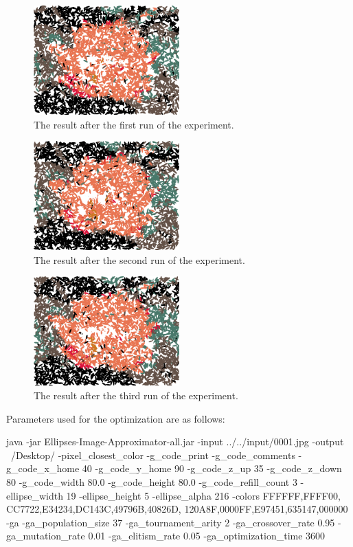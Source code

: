 \documentclass[conference]{IEEEtran}
\begin{document}
\begin{figure}[htbp]
\centerline{\includegraphics[width=0.5\textwidth]{fig02.png}}
\caption{The result after the first run of the experiment.}
\label{fig02}
\end{figure}

\begin{figure}[htbp]
\centerline{\includegraphics[width=0.5\textwidth]{fig03.png}}
\caption{The result after the second run of the experiment.}
\label{fig03}
\end{figure}

\begin{figure}[htbp]
\centerline{\includegraphics[width=0.5\textwidth]{fig04.png}}
\caption{The result after the third run of the experiment.}
\label{fig04}
\end{figure}

Parameters used for the optimization are as follows:

\begin{verbnobox}[\small]
java -jar Ellipses-Image-Approximator-all.jar 
-input ../../input/0001.jpg -output ~/Desktop/ 
-pixel_closest_color -g_code_print 
-g_code_comments -g_code_x_home 40 
-g_code_y_home 90 -g_code_z_up 35 
-g_code_z_down 80 -g_code_width 80.0 
-g_code_height 80.0 -g_code_refill_count 3 
-ellipse_width 19 -ellipse_height 5 
-ellipse_alpha 216 -colors FFFFFF,FFFF00,
CC7722,E34234,DC143C,49796B,40826D,
120A8F,0000FF,E97451,635147,000000 -ga 
-ga_population_size 37 -ga_tournament_arity 2 
-ga_crossover_rate 0.95 -ga_mutation_rate 0.01 
-ga_elitism_rate 0.05 -ga_optimization_time 3600
\end{verbnobox}
\end{document}

